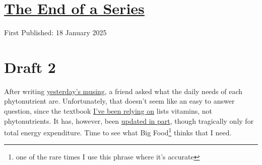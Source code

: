 \documentclass[12pt]{article}[titlepage]
\renewcommand{\,}{\textsuperscript{,}}
\begin{document}
\doublespacing
\section{\href{dietary-needs-5.html}{The End of a Series}}

First Published: 18 January 2025

\section{Draft 2}  
After writing \href{dietary-needs-4}{yesterday's musing}, a friend asked what the daily needs of each phytonutrient are.  
Unfortunately, that doesn't seem like an easy to answer question, since the textbook \href{https://nap.nationalacademies.org/read/11537/chapter/1}{I've been relying on} lists vitamins, not phytonutrients.  
It has, however, been \href{https://nap.nationalacademies.org/read/26818/chapter/1}{updated in part}, though tragically only for total energy expenditure.  
Time to see what Big Food\footnote{one of the rare times I use this phrase where it's accurate} thinks that I need.  
\end{document}
